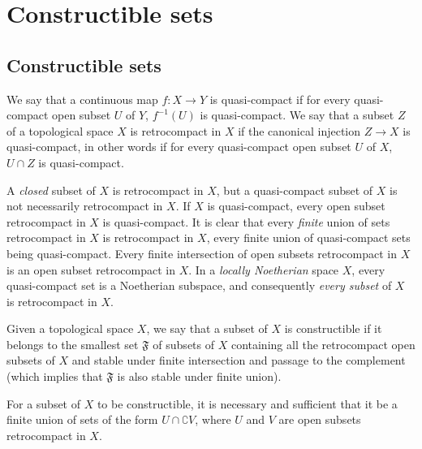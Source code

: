 \section{Constructible sets}
\label{section:0.9}

\subsection{Constructible sets}
\label{subsection:0.9.1}

\begin{definition}[9.1.1]
\label{0.9.1.1}
We say that a continuous map $f:X\to Y$ is quasi-compact if
for every quasi-compact open subset $U$ of $Y$, $f^{-1}(U)$ is quasi-compact. We
say that a subset $Z$ of a topological space $X$ is retrocompact
in $X$ if the canonical injection $Z\to X$ is quasi-compact, in other words
if for every quasi-compact open subset $U$ of $X$, $U\cap Z$ is quasi-compact.
\end{definition}

A \emph{closed} subset of $X$ is retrocompact in $X$, but a
quasi-compact subset of $X$ is not necessarily retrocompact in $X$. If
$X$ is quasi-compact, every open subset retrocompact in $X$ is
quasi-compact. It is clear that every \emph{finite} union of sets
retrocompact in $X$ is retrocompact in $X$, every finite union
of quasi-compact sets being quasi-compact. Every finite intersection
of open subsets retrocompact in $X$ is an open subset retrocompact in $X$. In a
\emph{locally Noetherian} space $X$, every quasi-compact set is a
Noetherian subspace, and consequently \emph{every subset} of $X$ is
retrocompact in $X$.

\begin{definition}[9.1.2]
\label{0.9.1.2}
Given a topological space $X$, we say that a subset of $X$ is
constructible if it belongs to the smallest set $\mathfrak{F}$ of
subsets of $X$ containing all the retrocompact open subsets of
$X$ and stable under finite intersection and passage to the complement
\textup{(which implies that $\mathfrak{F}$ is also} stable under finite union\textup{)}.
\end{definition}

\begin{proposition}[9.1.3]
\label{0.9.1.3}
For a subset of $X$ to be constructible, it is necessary and sufficient
that it be a finite union of sets of the form $U\cap\complement{V}$, where $U$
and $V$ are open subsets retrocompact in $X$.
\end{proposition}

